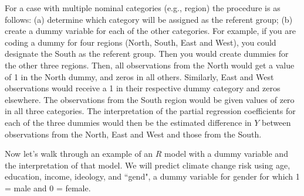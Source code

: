 \documentclass[11pt,openany]{book}
\begin{document}
For a case with multiple nominal categories (e.g., region) the procedure is as follows: (a) determine which category will be assigned as the referent group; (b) create a dummy variable for each of the other categories. For example, if you are coding a dummy for four regions (North, South, East and West), you could designate the South as the referent group. Then you would create dummies for the other three regions. Then, all observations from
the North would get a value of 1 in the North dummy, and zeros in all others. Similarly, East and West observations would receive a 1 in their respective dummy category and zeros elsewhere. The observations from the South region would be given values of zero in all three categories. The interpretation of the partial regression coefficients for each of the three dummies would then be the estimated difference in $Y$ between observations from the North, East and West and those from the South.

Now let's walk through an example of an $R$ model with a dummy variable and the interpretation of that model. We will predict climate change risk using age, education, income, ideology, and ``gend", a dummy variable for gender for which 1 = male and 0 = female. 
\end{document}
